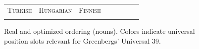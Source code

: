 \documentclass[11pt,letterpaper]{article}
\begin{document}
\begin{figure}[]
\begin{tabular}{cccccccc}
\textsc{Turkish} & \textsc{Hungarian} & \textsc{Finnish} \\
\begin{minipage}{.3\textwidth}
  
    \end{minipage}
  &
  \begin{minipage}{.3\textwidth}
  
    \end{minipage}
  &
  \begin{minipage}{.3\textwidth}
  
  \end{minipage}
  \end{tabular}
  
    \caption{Real and optimized ordering (nouns). Colors indicate universal position slots relevant for Greenbergs' Universal 39.}
    \label{fig:real_and_optimized_nouns}
\end{figure}
\end{document}
